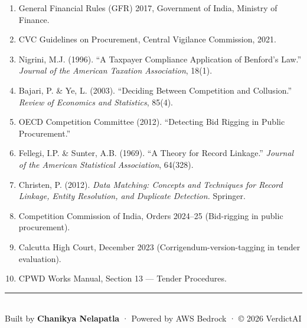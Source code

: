 \documentclass[11pt,a4paper]{article}
\begin{document}
\begin{enumerate}[nosep]
    \item General Financial Rules (GFR) 2017, Government of India, Ministry of Finance.
    \item CVC Guidelines on Procurement, Central Vigilance Commission, 2021.
    \item Nigrini, M.J. (1996). ``A Taxpayer Compliance Application of Benford's Law.'' \textit{Journal of the American Taxation Association}, 18(1).
    \item Bajari, P. \& Ye, L. (2003). ``Deciding Between Competition and Collusion.'' \textit{Review of Economics and Statistics}, 85(4).
    \item OECD Competition Committee (2012). ``Detecting Bid Rigging in Public Procurement.''
    \item Fellegi, I.P. \& Sunter, A.B. (1969). ``A Theory for Record Linkage.'' \textit{Journal of the American Statistical Association}, 64(328).
    \item Christen, P. (2012). \textit{Data Matching: Concepts and Techniques for Record Linkage, Entity Resolution, and Duplicate Detection.} Springer.
    \item Competition Commission of India, Orders 2024--25 (Bid-rigging in public procurement).
    \item Calcutta High Court, December 2023 (Corrigendum-version-tagging in tender evaluation).
    \item CPWD Works Manual, Section 13 — Tender Procedures.
\end{enumerate}

\vfill
\begin{center}
\textcolor{crpfblue}{\rule{0.5\textwidth}{0.5pt}}\\[0.3cm]
{\small Built by \textbf{Chanikya Nelapatla} · Powered by AWS Bedrock · © 2026 VerdictAI}
\end{center}
\end{document}
